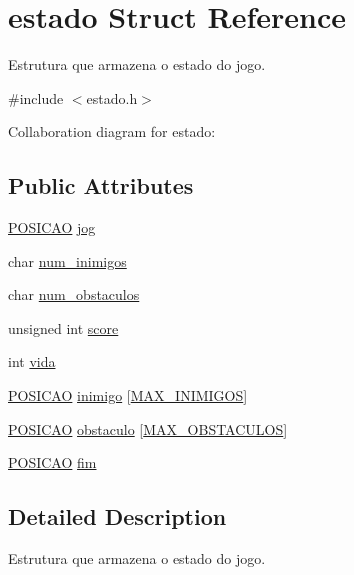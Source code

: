 \hypertarget{structestado}{}\section{estado Struct Reference}
\label{structestado}


Estrutura que armazena o estado do jogo.  




{\ttfamily \#include $<$estado.\+h$>$}



Collaboration diagram for estado\+:
\subsection*{Public Attributes}
\begin{DoxyCompactItemize}
\item 
\hyperlink{estado_8h_a55b3f4b56938eeb8fa5e8f9c07baf1b0}{P\+O\+S\+I\+C\+AO} \hyperlink{structestado_abf55d0d40aafdd6829efbc8265b4f724}{jog}
\item 
char \hyperlink{structestado_a6fbc4a80c4f371036f264ecfe27e5f9e}{num\+\_\+inimigos}
\item 
char \hyperlink{structestado_ac1a8a541e2301189833c6f713c416063}{num\+\_\+obstaculos}
\item 
unsigned int \hyperlink{structestado_a2a942cbf4c428e31bdcf60c13bedba48}{score}
\item 
int \hyperlink{structestado_aa07b03f94dec49b294dbc278b12b4d11}{vida}
\item 
\hyperlink{estado_8h_a55b3f4b56938eeb8fa5e8f9c07baf1b0}{P\+O\+S\+I\+C\+AO} \hyperlink{structestado_a8f7d47deb337ae082beab6a574ace9e3}{inimigo} \mbox{[}\hyperlink{estado_8h_aa97e6cbfdd94711688f1176cb8dd916a}{M\+A\+X\+\_\+\+I\+N\+I\+M\+I\+G\+OS}\mbox{]}
\item 
\hyperlink{estado_8h_a55b3f4b56938eeb8fa5e8f9c07baf1b0}{P\+O\+S\+I\+C\+AO} \hyperlink{structestado_a970dc20c6687acb17c3f08c06edbed4f}{obstaculo} \mbox{[}\hyperlink{estado_8h_ac574e2817856ecc9a890d2d47cb9d783}{M\+A\+X\+\_\+\+O\+B\+S\+T\+A\+C\+U\+L\+OS}\mbox{]}
\item 
\hyperlink{estado_8h_a55b3f4b56938eeb8fa5e8f9c07baf1b0}{P\+O\+S\+I\+C\+AO} \hyperlink{structestado_aee4059f33bcc5157fef35c73197be4ac}{fim}
\end{DoxyCompactItemize}


\subsection{Detailed Description}
Estrutura que armazena o estado do jogo. 

